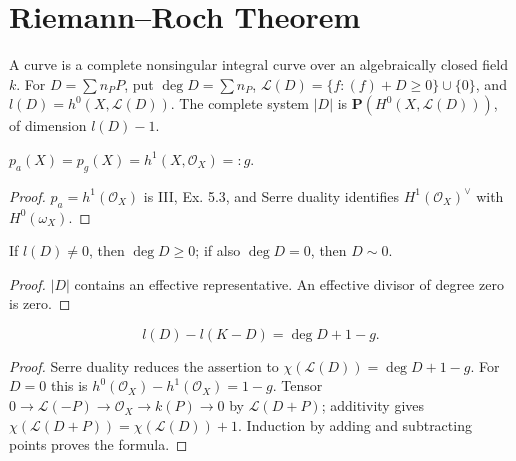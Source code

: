 \section{Riemann--Roch Theorem}
\label{ha-ch4-s1}
\begin{convention}\label{ha-ch4-conv}
A curve is a complete nonsingular integral curve over an algebraically closed
field \(k\).  For \(D=\sum n_PP\), put
\(\deg D=\sum n_P\), \(\mathcal L(D)=\{f:(f)+D\ge0\}\cup\{0\}\), and
\(l(D)=h^0(X,\mathcal L(D))\).  The complete system \(|D|\) is
\(\mathbf P(H^0(X,\mathcal L(D)))\), of dimension \(l(D)-1\).
\end{convention}

\begin{proposition}[Genus]\label{ha-ch4-p11}
\(p_a(X)=p_g(X)=h^1(X,\mathcal O_X)=:g\).
\end{proposition}
\begin{proof}
\(p_a=h^1(\mathcal O_X)\) is III, Ex. 5.3, and Serre duality identifies
\(H^1(\mathcal O_X)^\vee\) with \(H^0(\omega_X)\).
\end{proof}

\begin{lemma}\label{ha-ch4-l12}
If \(l(D)\ne0\), then \(\deg D\ge0\); if also \(\deg D=0\), then \(D\sim0\).
\end{lemma}
\begin{proof}
\(|D|\) contains an effective representative.  An effective divisor of degree
zero is zero.
\end{proof}

\begin{theorem}\label{ha-ch4-t13}
\[
l(D)-l(K-D)=\deg D+1-g.
\]
\end{theorem}
\begin{proof}
Serre duality reduces the assertion to
\(\chi(\mathcal L(D))=\deg D+1-g\).  For \(D=0\) this is
\(h^0(\mathcal O_X)-h^1(\mathcal O_X)=1-g\).  Tensor
\(0\to\mathcal L(-P)\to\mathcal O_X\to k(P)\to0\) by \(\mathcal L(D+P)\);
additivity gives \(\chi(\mathcal L(D+P))=\chi(\mathcal L(D))+1\).
Induction by adding and subtracting points proves the formula.
\end{proof}

